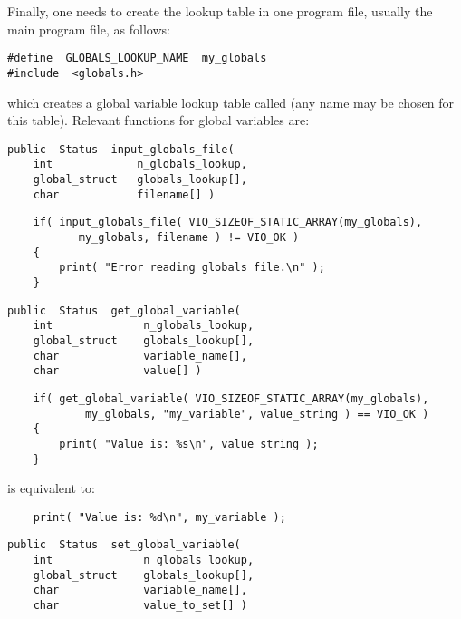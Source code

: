 Finally, one needs to create the lookup table in one program file,
usually the main program file, as follows:
{\bf\begin{verbatim}
#define  GLOBALS_LOOKUP_NAME  my_globals
#include  <globals.h>
\end{verbatim}}
which creates a global variable lookup table called
 (any name may be chosen for this table).
Relevant functions for global variables are:


{\bf\begin{verbatim}
public  Status  input_globals_file(
    int             n_globals_lookup,
    global_struct   globals_lookup[],
    char            filename[] )
\end{verbatim}}

{\bf\begin{verbatim}
    if( input_globals_file( VIO_SIZEOF_STATIC_ARRAY(my_globals),
           my_globals, filename ) != VIO_OK )
    {
        print( "Error reading globals file.\n" );
    }
\end{verbatim}}

{\bf\begin{verbatim}
public  Status  get_global_variable(
    int              n_globals_lookup,
    global_struct    globals_lookup[],
    char             variable_name[],
    char             value[] )
\end{verbatim}}

{\bf\begin{verbatim}
    if( get_global_variable( VIO_SIZEOF_STATIC_ARRAY(my_globals),
            my_globals, "my_variable", value_string ) == VIO_OK )
    {
        print( "Value is: %s\n", value_string );
    }
\end{verbatim}}
is equivalent to:
{\bf\begin{verbatim}
    print( "Value is: %d\n", my_variable );
\end{verbatim}}

{\bf\begin{verbatim}
public  Status  set_global_variable(
    int              n_globals_lookup,
    global_struct    globals_lookup[],
    char             variable_name[],
    char             value_to_set[] )
\end{verbatim}}

